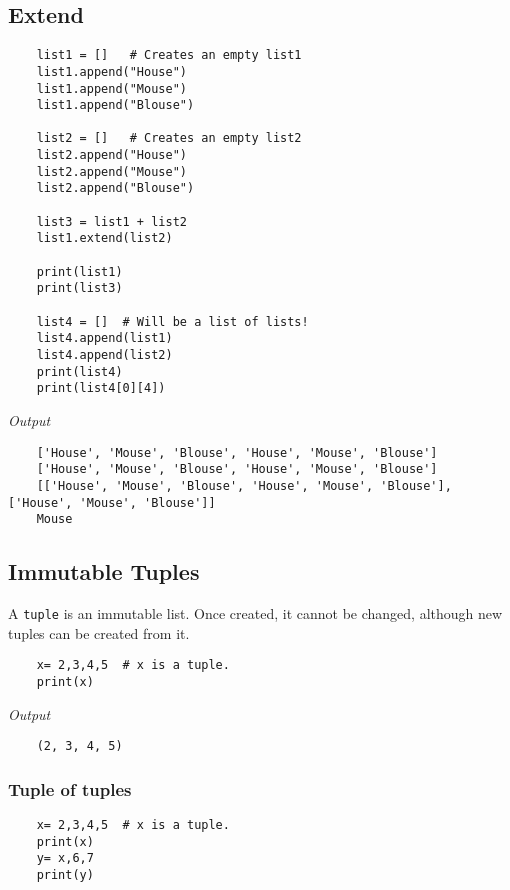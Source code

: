 \documentclass{report}
\begin{document}
	\subsection{Extend}
	\vspace{-15pt}
	\begin{verbatim}
	list1 = []   # Creates an empty list1
	list1.append("House")
	list1.append("Mouse")
	list1.append("Blouse")
	
	list2 = []   # Creates an empty list2
	list2.append("House")
	list2.append("Mouse")
	list2.append("Blouse")
	
	list3 = list1 + list2
	list1.extend(list2)
	
	print(list1)
	print(list3)
	
	list4 = []  # Will be a list of lists!
	list4.append(list1)
	list4.append(list2)
	print(list4)
	print(list4[0][4])
	\end{verbatim}
	\vspace{-10pt}
	
	\textit{Output}
	\vspace{-15pt}
	\begin{verbatim}
	['House', 'Mouse', 'Blouse', 'House', 'Mouse', 'Blouse']
	['House', 'Mouse', 'Blouse', 'House', 'Mouse', 'Blouse']
	[['House', 'Mouse', 'Blouse', 'House', 'Mouse', 'Blouse'], ['House', 'Mouse', 'Blouse']]
	Mouse
	\end{verbatim}
	\vspace{-10pt}
	
	\subsection{Immutable Tuples}
	A \verb|tuple| is an immutable list. Once created, it cannot be changed, although new tuples can be created from it. 
	\vspace{-15pt}
	\begin{verbatim}
	x= 2,3,4,5  # x is a tuple.
	print(x)
	\end{verbatim}
	\vspace{-10pt}
	
	\textit{Output}
	\vspace{-15pt}
	\begin{verbatim}
	(2, 3, 4, 5)
	\end{verbatim}
	\vspace{-10pt}
	
	\subsubsection{Tuple of tuples}
	\vspace{-15pt}
	\begin{verbatim}
	x= 2,3,4,5  # x is a tuple.
	print(x)
	y= x,6,7
	print(y)
	\end{verbatim}
	\vspace{-10pt}
	
\end{document}
